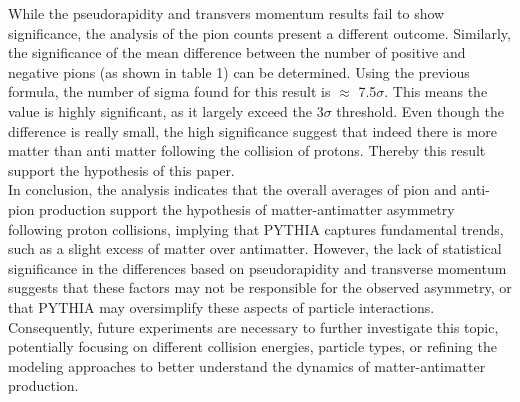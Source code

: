 While the pseudorapidity and transvers momentum results fail to show significance, the analysis of the pion counts present a different outcome. Similarly, the significance of the mean difference between the number of positive and negative pions (as shown in table 1) can be determined. Using the previous formula, the number of sigma found for this result is $\approx$ 7.5$\sigma$. This means the value is highly significant, as it largely exceed the 3$\sigma$ threshold. Even though the difference is really small, the high significance suggest that indeed there is more matter than anti matter following the collision of protons. Thereby this result support the hypothesis of this paper.
\\

In conclusion, the analysis indicates that the overall averages of pion and anti-pion production support the hypothesis of matter-antimatter asymmetry following proton collisions, implying that PYTHIA captures fundamental trends, such as a slight excess of matter over antimatter. However, the lack of statistical significance in the differences based on pseudorapidity and transverse momentum suggests that these factors may not be responsible for the observed asymmetry, or that PYTHIA may oversimplify these aspects of particle interactions. Consequently, future experiments are necessary to further investigate this topic, potentially focusing on different collision energies, particle types, or refining the modeling approaches to better understand the dynamics of matter-antimatter production.